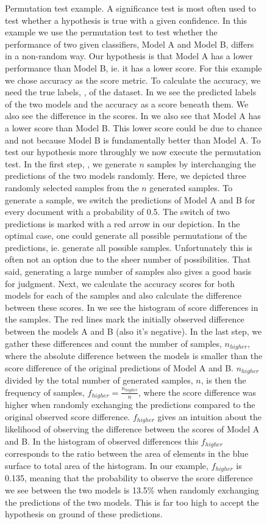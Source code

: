 \begin{figure}[ht]
  \caption{
  Permutation test example.
  A significance test is most often used to test whether a hypothesis is true with a given confidence.
  In this example we use the permutation test to test whether the 
  performance of two given classifiers, Model A and Model B, differs in a non-random way. Our hypothesis is that Model A has a lower performance than Model B, ie. it has a lower score.
  For this example we chose accuracy as the score metric. 
  To calculate the accuracy, we need the true labels, \textbf{}, of the dataset.
  In \textbf{} we see the predicted labels of the two models and the accuracy as a score beneath them. 
  We also see the difference in the scores.
  In \textbf{} we also see that Model A has a lower score than Model B.
  This lower score could be due to chance and not because Model B is fundamentally better than Model A.
  To test our hypothesis more throughly we now execute the permutation test.
  In the first step, \textbf{}, we generate $n$ samples by interchanging the predictions of the two models randomly.
  Here, we depicted three randomly selected samples from the $n$ generated samples.
  To generate a sample, we switch the predictions of Model A and B for every document with a probability of 0.5.
  The switch of two predictions is marked with a red arrow in our depiction.
  In the optimal case, one could generate all possible permutations of the predictions, ie. generate all possible samples.
  Unfortunately this is often not an option due to the sheer number of possibilities. That said, generating a large number of samples also gives a good basis for judgment.
  Next, we calculate the accuracy scores for both models for each of the samples and also calculate the difference between these scores.
  In \textbf{} we see the histogram of score differences in the samples.
  The red lines mark the initially observed difference between the models A and B (also it's negative).
  In the last step, we gather these differences and count the number of samples, $n_{higher}$, where the absolute difference between the models is smaller than the score difference of the original predictions of Model A and B.
  $n_{higher}$ divided by the total number of generated samples, $n$, is then the frequency of samples, $f_{higher} = \frac{n_{higher}}{n}$, where the score difference was higher when randomly exchanging the predictions compared to the original observed score difference.
  $f_{higher}$ gives an intuition about the likelihood of observing the difference between the scores of Model A and B.
  In the histogram of observed differences \textbf{} this $f_{higher}$ corresponds to the ratio between the area of elements in the blue surface to total area of the histogram.
  In our example, $f_{higher}$ is 0.135, meaning that the probability to observe the score difference we see between the two models is 13.5\% when randomly exchanging the predictions of the two models.
  This is far too high to accept the hypothesis on ground of these predictions.}
\end{figure}

